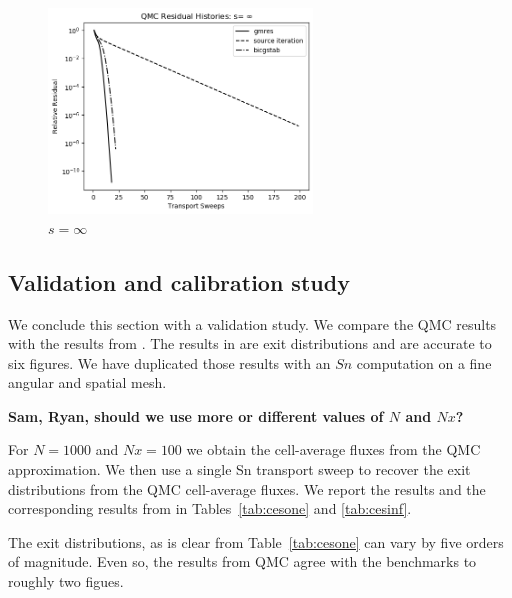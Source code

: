 \begin{figure}[t]%
  \centering
  \includegraphics[trim = 10mm 0mm 15mm 15mm, width=70mm]{FIGURES/seqinf.png}
  \caption{$s = \infty$}
  \label{fig:hard}
\end{figure}

\subsection{Validation and calibration study}
\label{validation-and-calibration-study}

We conclude this section with a validation study. We compare the
QMC results with the results from \cite{cesinh}. The results
in \cite{cesinh} are exit distributions and are accurate to 
six figures. We have duplicated those results with an $Sn$ computation
on a fine angular and spatial mesh.

{\bf Sam, Ryan, should we use more or different values of $N$ and $Nx$?}

For $N = 1000$ and $Nx=100$ we obtain the cell-average fluxes from
the QMC approximation. We then use a single Sn transport sweep to recover
the exit distributions from the QMC cell-average fluxes. We report
the results and the corresponding results from \cite{cesinh} in 
Tables~\ref{tab:cesone} and \ref{tab:cesinf}.

The exit distributions, as is clear from Table~\ref{tab:cesone}
can vary by five orders of magnitude. Even so, the results from QMC
agree with the benchmarks to roughly two figues.

